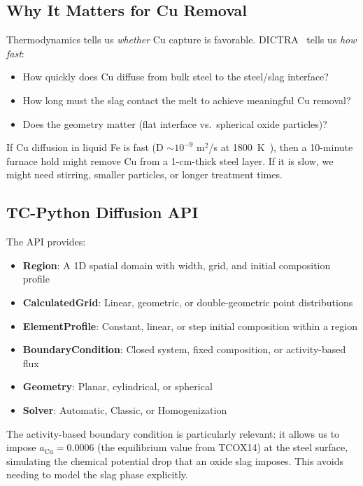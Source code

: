 \documentclass[11pt]{article}
\begin{document}
\subsection{Why It Matters for Cu Removal}

Thermodynamics tells us \textit{whether} Cu capture is favorable. DICTRA~\cite{Andersson2002} tells us \textit{how fast}:
\begin{itemize}[leftmargin=*]
    \item How quickly does Cu diffuse from bulk steel to the steel/slag interface?
    \item How long must the slag contact the melt to achieve meaningful Cu removal?
    \item Does the geometry matter (flat interface vs.\ spherical oxide particles)?
\end{itemize}

If Cu diffusion in liquid Fe is fast (D $\sim 10^{-9}$ m$^2$/s at \SI{1800}{\kelvin}~\cite{Hino2010}), then a 10-minute furnace hold might remove Cu from a 1-cm-thick steel layer. If it is slow, we might need stirring, smaller particles, or longer treatment times.

\subsection{TC-Python Diffusion API}

The API provides:
\begin{itemize}[leftmargin=*]
    \item \textbf{Region}: A 1D spatial domain with width, grid, and initial composition profile
    \item \textbf{CalculatedGrid}: Linear, geometric, or double-geometric point distributions
    \item \textbf{ElementProfile}: Constant, linear, or step initial composition within a region
    \item \textbf{BoundaryCondition}: Closed system, fixed composition, or activity-based flux
    \item \textbf{Geometry}: Planar, cylindrical, or spherical
    \item \textbf{Solver}: Automatic, Classic, or Homogenization
\end{itemize}

The activity-based boundary condition is particularly relevant: it allows us to impose $a_{\text{Cu}} = 0.0006$ (the equilibrium value from TCOX14) at the steel surface, simulating the chemical potential drop that an oxide slag imposes. This avoids needing to model the slag phase explicitly.
\end{document}
